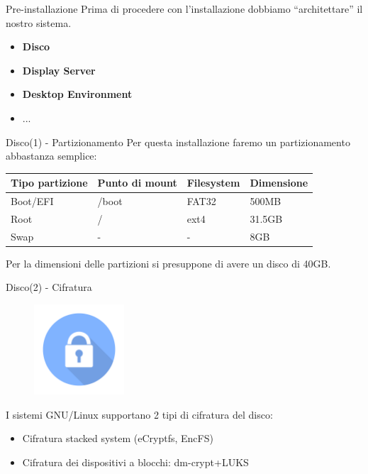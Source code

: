 \begin{frame}{Pre-installazione}
    Prima di procedere con l'installazione dobbiamo ``architettare''
    il nostro sistema.
    \begin{itemize}
        \item \textbf{Disco}
        \item \textbf{Display Server}
        \item \textbf{Desktop Environment}
        \item ...
    \end{itemize}
\end{frame}
\begin{frame}{Disco(1) - Partizionamento}
Per questa installazione faremo un partizionamento abbastanza semplice:
\vspace{20pt}
\begin{center}
    \begin{tabular}{ | m{7em} | m{8em} | m{5em}| m{5em} | } 
        \hline
        \textbf{Tipo partizione} & \textbf{Punto di mount} & \textbf{Filesystem} & \textbf{Dimensione} \\ 
        \hline
        Boot/EFI & /boot & FAT32 & 500MB \\ 
        \hline
        Root & / & ext4 & 31.5GB \\ 
        \hline
        Swap & - & - & 8GB \\
        \hline
    \end{tabular}
\end{center}
\vspace{20pt}
Per la dimensioni delle partizioni si presuppone di avere un disco di 40GB.
\end{frame}

\begin{frame}{Disco(2) - Cifratura}
    \begin{figure}[h]
        \includegraphics[width=0.3\textwidth]{images/encryption.png}
    \end{figure}
I sistemi GNU/Linux supportano 2 tipi di cifratura del disco:
\begin{itemize}
    \item Cifratura stacked system (eCryptfs, EncFS)
    \item Cifratura dei dispositivi a blocchi: dm-crypt+LUKS
\end{itemize}
\end{frame}

